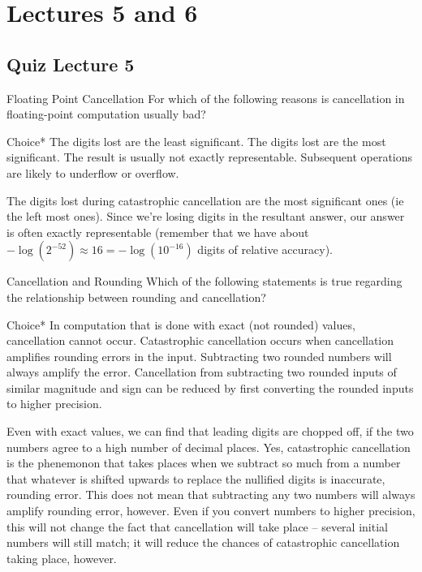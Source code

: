 \documentclass[../main.tex]{subfiles}
\begin{document}
\section{Lectures 5 and 6}

\subsection{Quiz Lecture 5}
Floating Point Cancellation
For which of the following reasons is cancellation in floating-point computation usually bad?

Choice*
The digits lost are the least significant.
The digits lost are the most significant.
The result is usually not exactly representable.
Subsequent operations are likely to underflow or overflow.

\begin{solution}
    The digits lost during catastrophic cancellation are the most significant ones (ie the left most ones). Since we're losing digits in the resultant answer, our answer is often exactly representable (remember that we have about $-\log(2^{-52}) \approx 16 = -\log(10^{-16})$ digits of relative accuracy).
\end{solution}

Cancellation and Rounding
Which of the following statements is true regarding the relationship between rounding and cancellation?

Choice*
In computation that is done with exact (not rounded) values, cancellation cannot occur.
Catastrophic cancellation occurs when cancellation amplifies rounding errors in the input.
Subtracting two rounded numbers will always amplify the error.
Cancellation from subtracting two rounded inputs of similar magnitude and sign can be reduced by first converting the rounded inputs to higher precision.
\begin{solution}
    Even with exact values, we can find that leading digits are chopped off, if the two numbers agree to a high number of decimal places. Yes, catastrophic cancellation is the phenemonon that takes places when we subtract so much from a number that whatever is shifted upwards to replace the nullified digits is inaccurate, rounding error. This does not mean that subtracting any two numbers will always amplify rounding error, however. Even if you convert numbers to higher precision, this will not change the fact that cancellation will take place -- several initial numbers will still match; it will reduce the chances of catastrophic cancellation taking place, however.
\end{solution}
\end{document}
